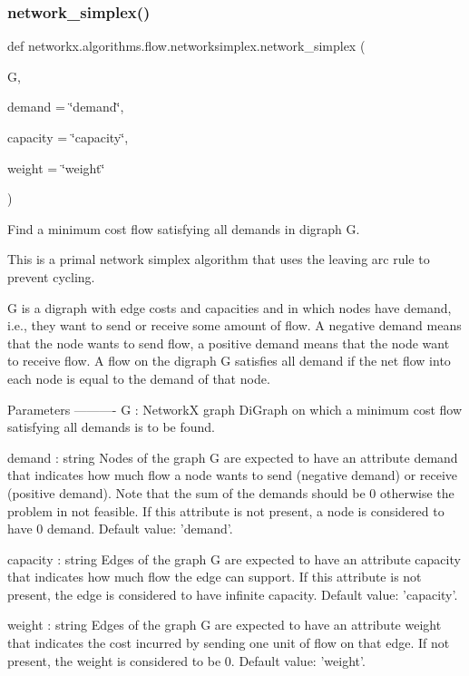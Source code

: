 \subsubsection{\texorpdfstring{network\+\_\+simplex()}{network\_simplex()}}
{\footnotesize\ttfamily def networkx.\+algorithms.\+flow.\+networksimplex.\+network\+\_\+simplex (\begin{DoxyParamCaption}\item[{}]{G,  }\item[{}]{demand = {\ttfamily \char`\"{}demand\char`\"{}},  }\item[{}]{capacity = {\ttfamily \char`\"{}capacity\char`\"{}},  }\item[{}]{weight = {\ttfamily \char`\"{}weight\char`\"{}} }\end{DoxyParamCaption})}

\begin{DoxyVerb}Find a minimum cost flow satisfying all demands in digraph G.

This is a primal network simplex algorithm that uses the leaving
arc rule to prevent cycling.

G is a digraph with edge costs and capacities and in which nodes
have demand, i.e., they want to send or receive some amount of
flow. A negative demand means that the node wants to send flow, a
positive demand means that the node want to receive flow. A flow on
the digraph G satisfies all demand if the net flow into each node
is equal to the demand of that node.

Parameters
----------
G : NetworkX graph
    DiGraph on which a minimum cost flow satisfying all demands is
    to be found.

demand : string
    Nodes of the graph G are expected to have an attribute demand
    that indicates how much flow a node wants to send (negative
    demand) or receive (positive demand). Note that the sum of the
    demands should be 0 otherwise the problem in not feasible. If
    this attribute is not present, a node is considered to have 0
    demand. Default value: 'demand'.

capacity : string
    Edges of the graph G are expected to have an attribute capacity
    that indicates how much flow the edge can support. If this
    attribute is not present, the edge is considered to have
    infinite capacity. Default value: 'capacity'.

weight : string
    Edges of the graph G are expected to have an attribute weight
    that indicates the cost incurred by sending one unit of flow on
    that edge. If not present, the weight is considered to be 0.
    Default value: 'weight'.


\end{DoxyVerb}

